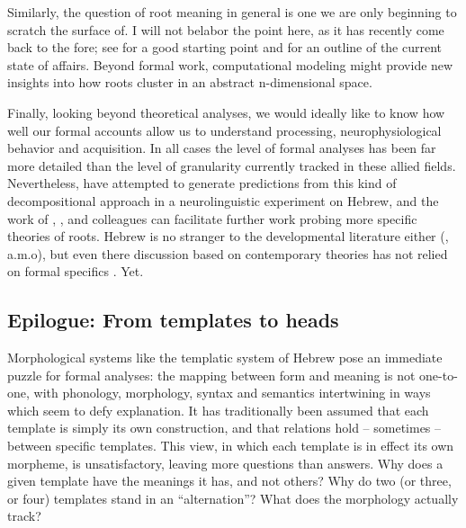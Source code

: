 \begin{exe}
\begin{xlist}
\begin{xlist}
\begin{xlist}
\begin{xlist}
\begin{xlist}
\begin{xlist}
\begin{exe}
\begin{xlist}
\begin{exe}
\begin{exe}
\begin{xlist}
\begin{exe}
\begin{exe}
\begin{xlist}
\begin{exe}
\begin{xlist}
\begin{exe}
\begin{xlist}
\begin{exe}
\begin{xlist}
\begin{exe}
\begin{xlist}
\begin{exe}
\begin{xlist}
\begin{exe}
\begin{xlist}
\begin{exe}
\begin{xlist}
\begin{exe}
\begin{xlist}
\begin{exe}
\begin{xlist}
\begin{exe}
\begin{xlist}
Similarly, the question of root meaning in general is one we are only beginning to scratch the surface of. I will not belabor the point here, as it has recently come back to the fore; see \cite{harley14thlia} for a good starting point and \cite{kastnertucker19cup} for an outline of the current state of affairs.
Beyond formal work, computational modeling might provide new insights into how roots cluster in an abstract n-dimensional space.

Finally, looking beyond theoretical analyses, we would ideally like to know how well our formal accounts allow us to understand processing, neurophysiological behavior and acquisition. In all cases the level of formal analyses has been far more detailed than the level of granularity currently tracked in these allied fields. Nevertheless, \cite{kastneretal18} have attempted to generate predictions from this kind of decompositional approach in a neurolinguistic experiment on Hebrew, and the work of \cite{frostetal97}, \cite{fmdpmetal05jml}, \cite{deutschkuperman18} and colleagues can facilitate further work probing more specific theories of roots. Hebrew is no stranger to the developmental literature either (\citealt{berman82,berman93jcl,ashkenazietal16,ravidetaltilar,havronarnon17jcl}, a.m.o), but even there discussion based on contemporary theories has not relied on formal specifics \citep{borer04,kastneradriaans17}. Yet.

	\subsection{Epilogue: From templates to heads}
Morphological systems like the templatic system of Hebrew pose an immediate puzzle for formal analyses: the mapping between form and meaning is not one-to-one, with phonology, morphology, syntax and semantics intertwining in ways which seem to defy explanation. It has traditionally been assumed that each template is simply its own construction, and that relations hold -- sometimes -- between specific templates. This view, in which each template is in effect its own morpheme, is unsatisfactory, leaving more questions than answers. Why does a given template have the meanings it has, and not others? Why do two (or three, or four) templates stand in an ``alternation''? What does the morphology actually track?


\end{xlist}
\end{exe}
\end{xlist}
\end{exe}
\end{xlist}
\end{exe}
\end{xlist}
\end{exe}
\end{xlist}
\end{exe}
\end{xlist}
\end{exe}
\end{xlist}
\end{exe}
\end{xlist}
\end{exe}
\end{xlist}
\end{exe}
\end{xlist}
\end{exe}
\end{xlist}
\end{exe}
\end{exe}
\end{xlist}
\end{exe}
\end{exe}
\end{xlist}
\end{exe}
\end{xlist}
\end{xlist}
\end{xlist}
\end{xlist}
\end{xlist}
\end{xlist}
\end{exe}
